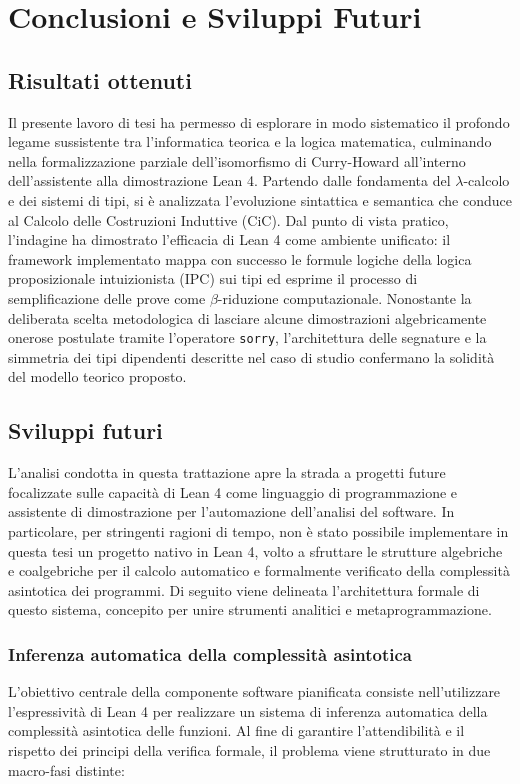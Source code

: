\chapter{Conclusioni e Sviluppi Futuri}
\label{chap:conclusions}

\section{Risultati ottenuti}
Il presente lavoro di tesi ha permesso di esplorare in modo sistematico il profondo legame sussistente tra l'informatica teorica e la logica matematica, 
culminando nella formalizzazione parziale dell'isomorfismo di Curry-Howard all'interno dell'assistente alla dimostrazione Lean 4. Partendo dalle fondamenta 
del $\lambda$-calcolo e dei sistemi di tipi, si è analizzata l'evoluzione sintattica e semantica che conduce al Calcolo delle Costruzioni Induttive (CiC). 
Dal punto di vista pratico, l'indagine ha dimostrato l'efficacia di Lean 4 come ambiente unificato: il framework implementato mappa con successo le formule 
logiche della logica proposizionale intuizionista (IPC) sui tipi ed esprime il processo di semplificazione delle prove come $\beta$-riduzione computazionale. 
Nonostante la deliberata scelta metodologica di lasciare alcune dimostrazioni algebricamente onerose postulate tramite l'operatore \texttt{sorry}, l'architettura 
delle segnature e la simmetria dei tipi dipendenti descritte nel caso di studio confermano la solidità del modello teorico proposto.

\section{Sviluppi futuri}
L'analisi condotta in questa trattazione apre la strada a progetti future focalizzate sulle capacità di Lean 4 come linguaggio di programmazione e assistente di 
dimostrazione per l'automazione dell'analisi del software. In particolare, per stringenti ragioni di tempo, non è stato possibile implementare in questa tesi un 
progetto nativo in Lean 4, volto a sfruttare le strutture algebriche e coalgebriche per il calcolo automatico e formalmente verificato della complessità asintotica 
dei programmi. Di seguito viene delineata l'architettura formale di questo sistema, concepito per unire strumenti analitici e metaprogrammazione.

\subsection{Inferenza automatica della complessità asintotica}
L'obiettivo centrale della componente software pianificata consiste nell'utilizzare l'espressività di Lean 4 per realizzare un sistema di inferenza automatica della complessità 
asintotica delle funzioni. Al fine di garantire l'attendibilità e il rispetto dei principi della verifica formale, il problema viene strutturato in due macro-fasi distinte:

